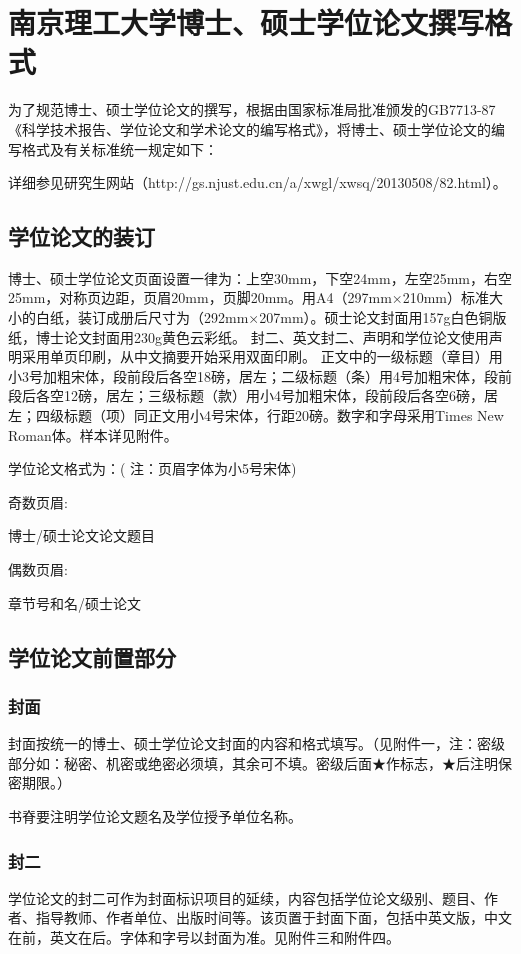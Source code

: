 
\chapter{南京理工大学博士、硕士学位论文撰写格式}
\label{app:format}
为了规范博士、硕士学位论文的撰写，根据由国家标准局批准颁发的GB7713-87《科学技术报告、学位论文和学术论文的编写格式》，将博士、硕士学位论文的编写格式及有关标准统一规定如下：

详细参见研究生网站（http://gs.njust.edu.cn/a/xwgl/xwsq/20130508/82.html）。

\section{学位论文的装订}

博士、硕士学位论文页面设置一律为：上空30mm，下空24mm，左空25mm，右空25mm，对称页边距，页眉20mm，页脚20mm。用A4（297mm×210mm）标准大小的白纸，装订成册后尺寸为（292mm×207mm）。硕士论文封面用157g白色铜版纸，博士论文封面用230g黄色云彩纸。
封二、英文封二、声明和学位论文使用声明采用单页印刷，从中文摘要开始采用双面印刷。
正文中的一级标题（章目）用小3号加粗宋体，段前段后各空18磅，居左；二级标题（条）用4号加粗宋体，段前段后各空12磅，居左；三级标题（款）用小4号加粗宋体，段前段后各空6磅，居左；四级标题（项）同正文用小4号宋体，行距20磅。数字和字母采用Times New Roman体。样本详见附件。

学位论文格式为：( 注：页眉字体为小5号宋体)

奇数页眉:

博士/硕士论文\hspace{40pt}论文题目

偶数页眉:

章节号和名\hspace{40pt}/硕士论文


\section{学位论文前置部分}
\subsection{封面}
封面按统一的博士、硕士学位论文封面的内容和格式填写。（见附件一，注：密级部分如：秘密、机密或绝密必须填，其余可不填。密级后面★作标志，★后注明保密期限。）

书脊要注明学位论文题名及学位授予单位名称。

\subsection{封二}
学位论文的封二可作为封面标识项目的延续，内容包括学位论文级别、题目、作者、指导教师、作者单位、出版时间等。该页置于封面下面，包括中英文版，中文在前，英文在后。字体和字号以封面为准。见附件三和附件四。

